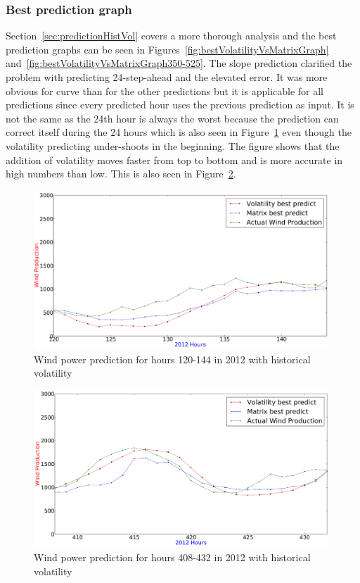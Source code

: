 \subsubsection{Best prediction graph}
Section~\ref{sec:predictionHistVol} covers a more thorough analysis and the best prediction graphs can be seen in Figures~\ref{fig:bestVolatilityVsMatrixGraph} and~\ref{fig:bestVolatilityVsMatrixGraph350-525}. The slope prediction clarified the problem with predicting 24-step-ahead and the elevated error. It was more obvious for curve than for the other predictions but it is applicable for all predictions since every predicted hour uses the previous prediction as input. It is not the same as the 24th hour is always the worst because the prediction can correct itself during the 24 hours which is also seen in Figure~\ref{fig:bestVolatility120to144} even though the volatility predicting under-shoots in the beginning. The figure shows that the addition of volatility moves faster from top to bottom and is more accurate in high numbers than low.
This is also seen in Figure~\ref{fig:bestVolatility408to432}.

\begin{figure}[H]
\centering
\includegraphics[width=0.99\textwidth]{billeder/bestVolatility120to144.png}
\caption{Wind power prediction for hours 120-144 in 2012 with historical volatility}
\label{fig:bestVolatility120to144}
\end{figure} 

\begin{figure}[H]
\centering
\includegraphics[width=0.99\textwidth]{billeder/bestVolatility408to432.png}
\caption{Wind power prediction for hours 408-432 in 2012 with historical volatility}
\label{fig:bestVolatility408to432}
\end{figure} 

